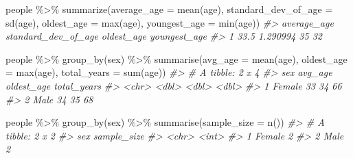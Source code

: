 \documentclass[
]{book}
\newenvironment{Shaded}{\begin{snugshade}}{\end{snugshade}}
\newcommand{\AttributeTok}[1]{\textcolor[rgb]{0.77,0.63,0.00}{#1}}
\newcommand{\CommentTok}[1]{\textcolor[rgb]{0.56,0.35,0.01}{\textit{#1}}}
\newcommand{\FunctionTok}[1]{\textcolor[rgb]{0.00,0.00,0.00}{#1}}
\newcommand{\NormalTok}[1]{#1}
\newcommand{\SpecialCharTok}[1]{\textcolor[rgb]{0.00,0.00,0.00}{#1}}
\begin{document}
\begin{Shaded}
\begin{Highlighting}[]
\NormalTok{people }\SpecialCharTok{\%\textgreater{}\%} 
  \FunctionTok{summarize}\NormalTok{(}\AttributeTok{average\_age =} \FunctionTok{mean}\NormalTok{(age),}
            \AttributeTok{standard\_dev\_of\_age =} \FunctionTok{sd}\NormalTok{(age),}
            \AttributeTok{oldest\_age =} \FunctionTok{max}\NormalTok{(age),}
            \AttributeTok{youngest\_age =} \FunctionTok{min}\NormalTok{(age))}
\CommentTok{\#\textgreater{}   average\_age standard\_dev\_of\_age oldest\_age youngest\_age}
\CommentTok{\#\textgreater{} 1        33.5            1.290994         35           32}
\end{Highlighting}
\end{Shaded}

\begin{Shaded}
\begin{Highlighting}[]
\NormalTok{people }\SpecialCharTok{\%\textgreater{}\%} 
  \FunctionTok{group\_by}\NormalTok{(sex) }\SpecialCharTok{\%\textgreater{}\%}
  \FunctionTok{summarise}\NormalTok{(}\AttributeTok{avg\_age =} \FunctionTok{mean}\NormalTok{(age),}
            \AttributeTok{oldest\_age =} \FunctionTok{max}\NormalTok{(age),}
            \AttributeTok{total\_years =} \FunctionTok{sum}\NormalTok{(age)) }
\CommentTok{\#\textgreater{} \# A tibble: 2 x 4}
\CommentTok{\#\textgreater{}   sex    avg\_age oldest\_age total\_years}
\CommentTok{\#\textgreater{}   \textless{}chr\textgreater{}    \textless{}dbl\textgreater{}      \textless{}dbl\textgreater{}       \textless{}dbl\textgreater{}}
\CommentTok{\#\textgreater{} 1 Female      33         34          66}
\CommentTok{\#\textgreater{} 2 Male        34         35          68}
\end{Highlighting}
\end{Shaded}

\begin{Shaded}
\begin{Highlighting}[]
\NormalTok{people }\SpecialCharTok{\%\textgreater{}\%}
  \FunctionTok{group\_by}\NormalTok{(sex) }\SpecialCharTok{\%\textgreater{}\%}
  \FunctionTok{summarise}\NormalTok{(}\AttributeTok{sample\_size =} \FunctionTok{n}\NormalTok{())}
\CommentTok{\#\textgreater{} \# A tibble: 2 x 2}
\CommentTok{\#\textgreater{}   sex    sample\_size}
\CommentTok{\#\textgreater{}   \textless{}chr\textgreater{}        \textless{}int\textgreater{}}
\CommentTok{\#\textgreater{} 1 Female           2}
\CommentTok{\#\textgreater{} 2 Male             2}
\end{Highlighting}
\end{Shaded}
\end{document}
